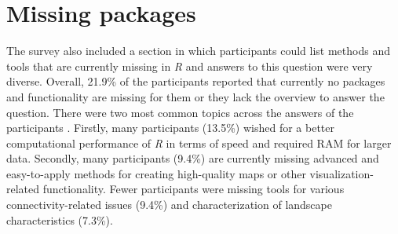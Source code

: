 \documentclass[smallextended]{svjour3}       %
\begin{document}
\FloatBarrier

\hypertarget{missing-packages}{%
\section{Missing packages}\label{missing-packages}}

The survey also included a section in which participants could list methods and tools that are currently missing in \emph{R} and answers to this question were very diverse.
Overall, 21.9\% of the participants reported that currently no packages and functionality are missing for them or they lack the overview to answer the question.
There were two most common topics across the answers of the participants .
Firstly, many participants (13.5\%) wished for a better computational performance of \emph{R} in terms of speed and required RAM for larger data.
Secondly, many participants (9.4\%) are currently missing advanced and easy-to-apply methods for creating high-quality maps or other visualization-related functionality.
Fewer participants were missing tools for various connectivity-related issues (9.4\%) and characterization of landscape characteristics (7.3\%).



\end{document}
